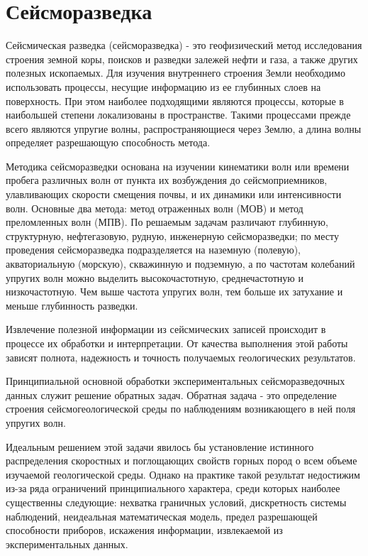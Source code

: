 \chapter*{Сейсморазведка}



Сейсмическая разведка (сейсморазведка) - это геофизический метод исследования строения земной коры, поисков и разведки залежей нефти и газа, а также других полезных ископаемых. Для изучения внутреннего строения Земли необходимо использовать процессы, несущие информацию из ее глубинных слоев на поверхность. При этом наиболее подходящими являются процессы, которые в наибольшей степени локализованы в пространстве. Такими процессами прежде всего являются упругие волны, распространяющиеся через Землю, а длина волны определяет разрешающую способность метода.

Методика сейсморазведки основана на изучении кинематики волн или времени пробега различных волн от пункта их возбуждения до сейсмоприемников, улавливающих скорости смещения почвы, и их динамики или интенсивности волн. Основные два метода: метод отраженных волн (МОВ) и метод преломленных волн (МПВ). По решаемым задачам различают глубинную, структурную, нефтегазовую, рудную, инженерную сейсморазведки; по месту проведения сейсморазведка подразделяется на наземную (полевую), акваториальную (морскую), скважинную и подземную, а по частотам колебаний упругих волн можно выделить высокочастотную, среднечастотную и низкочастотную. Чем выше частота упругих волн, тем больше их затухание и меньше глубинность разведки.






Извлечение полезной информации из сейсмических записей происходит в процессе их обработки и интерпретации. От качества выполнения этой работы зависят полнота, надежность и точность получаемых геологических результатов.

Принципиальной основной обработки экспериментальных сейсморазведочных данных служит решение обратных задач. Обратная задача - это определение строения сейсмогеологической среды по наблюдениям возникающего в ней поля упругих волн.

Идеальным решением этой задачи явилось бы установление истинного распределения скоростных и поглощающих свойств горных пород о всем объеме изучаемой геологической среды. Однако на практике такой результат недостижим из-за ряда ограничений принципиального характера, среди которых наиболее существенны следующие: нехватка граничных условий, дискретность системы наблюдений, неидеальная математическая модель, предел разрешающей способности приборов, искажения информации, извлекаемой из экспериментальных данных.

